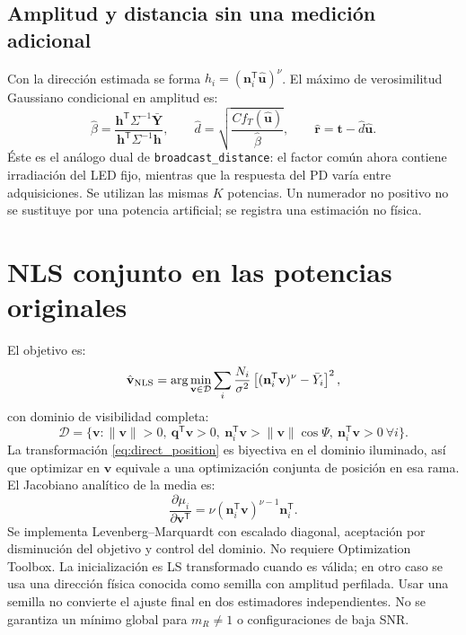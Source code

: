 \documentclass[11pt,a4paper]{article}
\begin{document}
\subsection{Amplitud y distancia sin una medición adicional}
Con la dirección estimada se forma $h_i=(\mathbf n_i^{\mathsf T}\hat{\mathbf u})^\nu$. El máximo de verosimilitud Gaussiano condicional en amplitud es:
\begin{equation}
 \hat\beta=\frac{\mathbf h^{\mathsf T}\Sigma^{-1}\bar{\mathbf Y}}
 {\mathbf h^{\mathsf T}\Sigma^{-1}\mathbf h},\qquad
 \hat d=\sqrt{\frac{Cf_T(\hat{\mathbf u})}{\hat\beta}},\qquad
 \hat{\mathbf r}=\mathbf t-\hat d\hat{\mathbf u}.
\label{eq:profile}
\end{equation}
Éste es el análogo dual de \texttt{broadcast\_distance}: el factor común ahora contiene irradiación del LED fijo, mientras que la respuesta del PD varía entre adquisiciones. Se utilizan las mismas $K$ potencias. Un numerador no positivo no se sustituye por una potencia artificial; se registra una estimación no física.

\section{NLS conjunto en las potencias originales}
El objetivo es:
\begin{equation}
 \hat{\mathbf v}_{\rm NLS}=\arg\min_{\mathbf v\in\mathcal D}
 \sum_i\frac{N_i}{\sigma^2}\left[(\mathbf n_i^{\mathsf T}\mathbf v)^\nu-\bar Y_i\right]^2,
\end{equation}
con dominio de visibilidad completa:
\begin{equation}
 \mathcal D=\{\mathbf v:\|\mathbf v\|>0,\ \mathbf q^{\mathsf T}\mathbf v>0,
 \ \mathbf n_i^{\mathsf T}\mathbf v>\|\mathbf v\|\cos\Psi,\ \mathbf n_i^{\mathsf T}\mathbf v>0\ \forall i\}.
\end{equation}
La transformación \eqref{eq:direct_position} es biyectiva en el dominio iluminado, así que optimizar en $\mathbf v$ equivale a una optimización conjunta de posición en esa rama. El Jacobiano analítico de la media es:
\begin{equation}
 \frac{\partial\mu_i}{\partial\mathbf v^{\mathsf T}}=
 \nu(\mathbf n_i^{\mathsf T}\mathbf v)^{\nu-1}\mathbf n_i^{\mathsf T}.
\end{equation}
Se implementa Levenberg--Marquardt con escalado diagonal, aceptación por disminución del objetivo y control del dominio. No requiere Optimization Toolbox. La inicialización es LS transformado cuando es válida; en otro caso se usa una dirección física conocida como semilla con amplitud perfilada. Usar una semilla no convierte el ajuste final en dos estimadores independientes. No se garantiza un mínimo global para $m_R\ne1$ o configuraciones de baja SNR.
\end{document}
